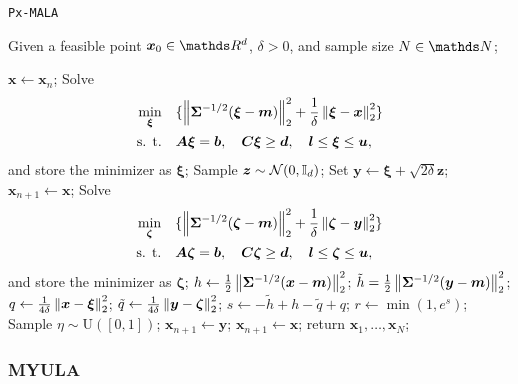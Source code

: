 \documentclass[10pt]{article}
\numberwithin{equation}{section}
\begin{document}
\begin{algorithm}[H]
\caption{\texttt{Px-MALA}}
Given a feasible point $\bm x_0 \in \R^d$, $\delta > 0$, and sample size $N \in \N$;
\begin{algorithmic}[2]\label{alg:pxmala}
\State $\bm x \gets \bm x_n$;
\State Solve
\begin{align*}
\min_{\bm \xi} & \quad \lbrace \left\|\bm \Sigma^{-1/2}(\bm \xi - \bm m)\right\|_2^2 + \frac{1}{\delta} \left\|\bm \xi - \bm x\right\|_2^2 \rbrace \\
\text{s. t.} & \quad \bm A \bm \xi = \bm b, \quad \bm C \bm \xi \geq \bm d, \quad \bm l \leq \bm \xi \leq \bm u,
\end{align*}
and store the minimizer as $\bm \xi$;
\State Sample $\bm z \sim \mathcal{N}(0, \mathbb{I}_d)$;
\State Set $\bm y \gets \bm \xi + \sqrt{2 \delta} \bm z$;
\State $\bm x_{n+1} \gets \bm x$;
\Else
\State Solve
\begin{align*}
\min_{\bm \zeta} & \quad \lbrace \left\|\bm \Sigma^{-1/2}(\bm \zeta - \bm m)\right\|_2^2 + \frac{1}{\delta} \left\|\bm \zeta - \bm y\right\|_2^2 \rbrace \\
\text{s. t.} & \quad \bm A \bm \zeta = \bm b, \quad \bm C \bm \zeta \geq \bm d, \quad \bm l \leq \bm \zeta \leq \bm u,
\end{align*}
and store the minimizer as $\bm \zeta$;
\State $h \gets \frac{1}{2} \left\|\bm \Sigma^{-1/2}(\bm x - \bm m)\right\|_2^2$;
\State $\tilde h = \frac{1}{2} \left\|\bm \Sigma^{-1/2}(\bm y - \bm m)\right\|_2^2$;
\State $q \gets \frac{1}{4 \delta}\left\|\bm x - \bm \xi\right\|_2^2$;
\State $\tilde q \gets \frac{1}{4 \delta}\left\|\bm y - \bm \zeta\right\|_2^2$;
\State $s \gets - \tilde h + h - \tilde q + q$;
\State $r \gets \min(1, e^s)$;
\State Sample $\eta \sim \mathrm{U}([0,1])$;
\State $\bm x_{n+1} \gets \bm y$;
\Else
\State $\bm x_{n+1} \gets \bm x$;
\EndIf
\EndIf
\EndFor
\State return $\bm x_1, \ldots, \bm x_N$;
\end{algorithmic}
\end{algorithm}


\subsubsection*{MYULA}
\end{document}
